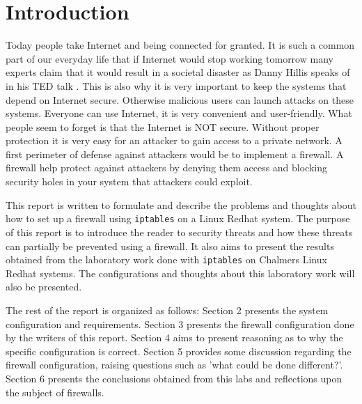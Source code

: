 \section{Introduction} 
\label{sec:intro}
Today people take Internet and being connected for granted. It is such a common part of our everyday life that if Internet would stop working tomorrow many experts claim that it would result in a societal disaster as Danny Hillis speaks of in his TED talk \cite{hillis13}. This is also why it is very important to keep the systems that depend on Internet secure. Otherwise malicious users can launch attacks on these systems. Everyone can use Internet, it is very convenient and user-friendly. What people seem to forget is that the Internet is NOT secure. Without proper protection it is very easy for an attacker to gain access to a private network. A first perimeter of defense against attackers would be to implement a firewall. A firewall help protect against attackers by denying them access and blocking security holes in your system that attackers could exploit.

This report is written to formulate and describe the problems and thoughts about how to set up a firewall using \verb;iptables; on a Linux Redhat system. The purpose of this report is to introduce the reader to security threats and how these threats can partially be prevented using a firewall. It also aims to present the results obtained from the laboratory work done with \verb;iptables; on Chalmers Linux Redhat systems. The configurations and thoughts about this laboratory work will also be presented.

The rest of the report is organized as follows: Section 2 presents the system configuration and requirements. Section 3 presents the firewall configuration done by the writers of this report. Section 4 aims to present reasoning as to why the specific configuration is correct. Section 5 provides some discussion regarding the firewall configuration, raising questions such as 'what could be done different?'. Section 6 presents the conclusions obtained from this labs and reflections upon the subject of firewalls.



